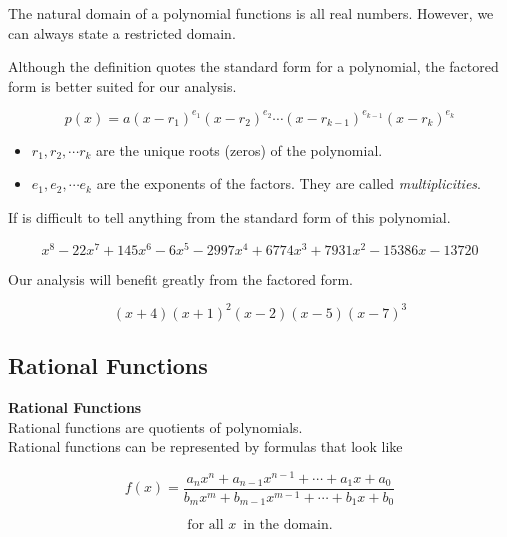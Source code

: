 \documentclass{ximera}
\begin{document}
The natural domain of a polynomial functions is all real numbers.  However, we can always state a restricted domain.




Although the definition quotes the standard form for a polynomial, the factored form is better suited for our analysis.

\[
p(x) = a (x - r_1)^{e_1} (x - r_2)^{e_2} \cdots (x - r_{k-1})^{e_{k-1}} (x - r_k)^{e_k}  
\]


\begin{itemize}
\item $r_1, r_2, \cdots r_k$ are the unique roots (zeros) of the polynomial.
\item $e_1, e_2, \cdots e_k$ are the exponents of the factors. They are called \textit{multiplicities}.
\end{itemize}



\begin{example}

If is difficult to tell anything from the standard form of this polynomial.

\[
x^8 - 22 x^7 +145 x^6 - 6 x^5 - 2997 x^4 + 6774 x^3 + 7931 x^2 - 15386 x - 13720
\]



Our analysis will benefit greatly from the factored form.


\[
(x+4) (x+1)^2 (x-2) (x-5) (x-7)^3
\]




\end{example}




















\subsection{Rational Functions}




\begin{template}  \textbf{\textcolor{blue!55!black}{Rational Functions}} \\



Rational functions are quotients of polynomials. \\


Rational functions can be represented by formulas that look like


\[ 
f(x) = \frac{ a_n x^n + a_{n-1} x^{n-1} + \cdots + a_1 x + a_0 } {b_m x^m + b_{m-1} x^{m-1} + \cdots + b_1 x + b_0}
\]


\[  \text{ for all } x  \, \text{ in the domain. }   \]



\end{template}
\end{document}
